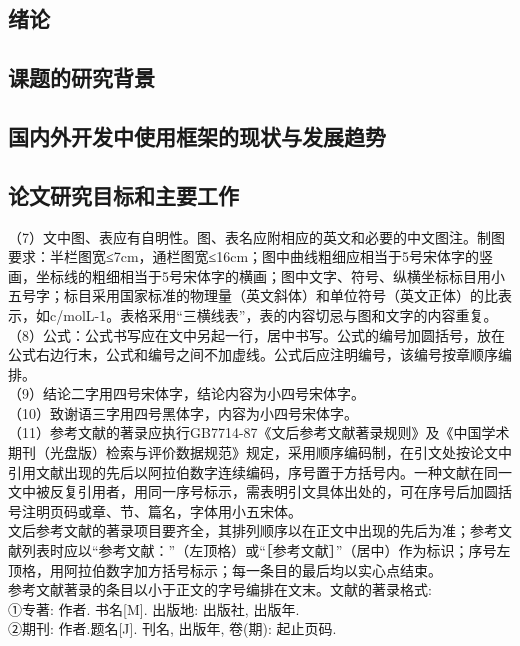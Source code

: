 \documentclass{xmuthesis}
\begin{document}
\begin{flushleft}
\mainmatter %


\chapter{绪论}

\section{课题的研究背景}
\section{国内外开发中使用框架的现状与发展趋势}
\section{论文研究目标和主要工作}
（7）文中图、表应有自明性。图、表名应附相应的英文和必要的中文图注。制图要求：半栏图宽≤7cm，通栏图宽≤16cm；图中曲线粗细应相当于5号宋体字的竖画，坐标线的粗细相当于5号宋体字的横画；图中文字、符号、纵横坐标标目用小五号字；标目采用国家标准的物理量（英文斜体）和单位符号（英文正体）的比表示，如c/molL-1。表格采用“三横线表”，表的内容切忌与图和文字的内容重复。\\
   （8）公式：公式书写应在文中另起一行，居中书写。公式的编号加圆括号，放在公式右边行末，公式和编号之间不加虚线。公式后应注明编号，该编号按章顺序编排。\\
（9）结论二字用四号宋体字，结论内容为小四号宋体字。\\
（10）致谢语三字用四号黑体字，内容为小四号宋体字。\\
   （11）参考文献的著录应执行GB7714-87《文后参考文献著录规则》及《中国学术期刊（光盘版）检索与评价数据规范》规定，采用顺序编码制，在引文处按论文中引用文献出现的先后以阿拉伯数字连续编码，序号置于方括号内。一种文献在同一文中被反复引用者，用同一序号标示，需表明引文具体出处的，可在序号后加圆括号注明页码或章、节、篇名，字体用小五宋体。\\
文后参考文献的著录项目要齐全，其排列顺序以在正文中出现的先后为准；参考文献列表时应以“参考文献：”（左顶格）或“［参考文献］”（居中）作为标识；序号左顶格，用阿拉伯数字加方括号标示；每一条目的最后均以实心点结束。\\
参考文献著录的条目以小于正文的字号编排在文末。文献的著录格式:\\
    ①专著: 作者. 书名[M]. 出版地: 出版社, 出版年.\\
    ②期刊: 作者.题名[J]. 刊名, 出版年, 卷(期): 起止页码.\\

\end{flushleft}
\end{document}
